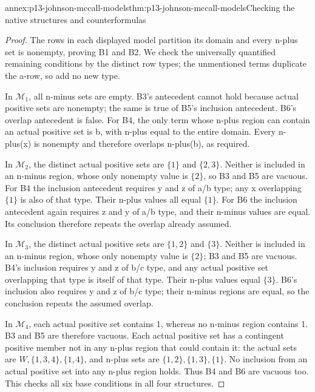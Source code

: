 \begin{annexitem}{annex:p13-johnson-mccall-models}{thm:p13-johnson-mccall-models}{Checking the native structures and counterformulas}
\begin{proof}
The rows in each displayed model partition its domain and every n-plus set
is nonempty, proving B1 and B2. We check the universally quantified remaining
conditions by the distinct row types; the unmentioned terms duplicate the
a-row, so add no new type.

In \(\mathcal M_1\), all n-minus sets are empty. B3's antecedent cannot
hold because actual positive sets are nonempty; the same is true of B5's
inclusion antecedent. B6's overlap antecedent is false. For B4, the only
term whose n-plus region can contain an actual positive set is b, with
n-plus equal to the entire domain. Every n-plus(x) is nonempty and therefore
overlaps n-plus(b), as required.

In \(\mathcal M_2\), the distinct actual positive sets are \(\{1\}\)
and \(\{2,3\}\). Neither is included in an n-minus region, whose only
nonempty value is \(\{2\}\), so B3 and B5 are vacuous. For B4 the
inclusion antecedent requires y and z of a/b type; any x overlapping
\(\{1\}\) is also of that type. Their n-plus values all equal \(\{1\}\).
For B6 the inclusion antecedent again requires z and y of a/b type,
and their n-minus values are equal. Its conclusion therefore repeats
the overlap already assumed.

In \(\mathcal M_3\), the distinct actual positive sets are \(\{1,2\}\)
and \(\{3\}\). Neither is included in an n-minus region, whose only
nonempty value is \(\{2\}\); B3 and B5 are vacuous. B4's inclusion
requires y and z of b/c type, and any actual positive set overlapping
that type is itself of that type. Their n-plus values equal \(\{3\}\).
B6's inclusion also requires y and z of b/c type; their n-minus regions
are equal, so the conclusion repeats the assumed overlap.

In \(\mathcal M_4\), each actual positive set contains 1, whereas no
n-minus region contains 1. B3 and B5 are therefore vacuous. Each actual
positive set has a contingent positive member not in any n-plus region
that could contain it: the actual sets are \(W,\{1,3,4\},\{1,4\}\),
and n-plus sets are \(\{1,2\},\{1,3\},\{1\}\). No inclusion from
an actual positive set into any n-plus region holds. Thus B4 and B6
are vacuous too. This checks all six base conditions in all four structures.


\end{proof}
\end{annexitem}
